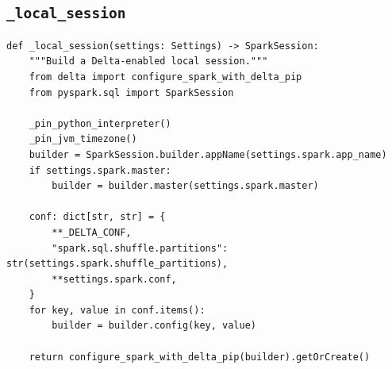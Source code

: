 \documentclass[11pt,a4paper]{report}
\DeclareRobustCommand{\code}[1]{\texttt{#1}}
\begin{document}
\subsection{\code{\_local\_session}}

\begin{lstlisting}[style=pystyle]
def _local_session(settings: Settings) -> SparkSession:
    """Build a Delta-enabled local session."""
    from delta import configure_spark_with_delta_pip
    from pyspark.sql import SparkSession

    _pin_python_interpreter()
    _pin_jvm_timezone()
    builder = SparkSession.builder.appName(settings.spark.app_name)
    if settings.spark.master:
        builder = builder.master(settings.spark.master)

    conf: dict[str, str] = {
        **_DELTA_CONF,
        "spark.sql.shuffle.partitions": str(settings.spark.shuffle_partitions),
        **settings.spark.conf,
    }
    for key, value in conf.items():
        builder = builder.config(key, value)

    return configure_spark_with_delta_pip(builder).getOrCreate()
\end{lstlisting}
\end{document}
